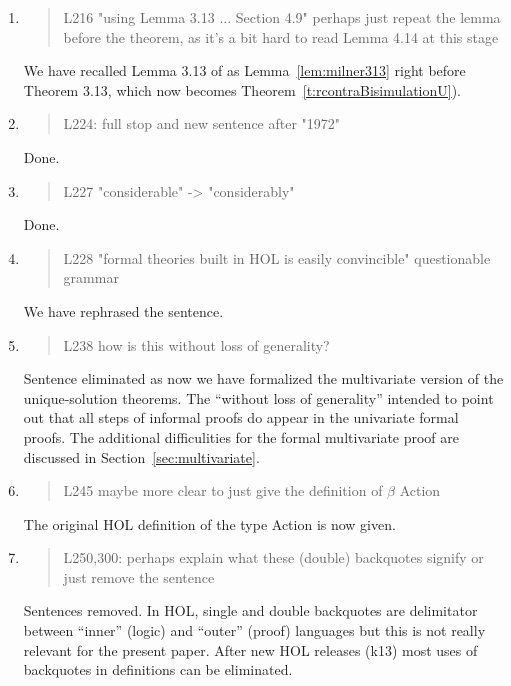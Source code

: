 \begin{enumerate}
\item \begin{quote}
    L216 "using Lemma 3.13 ... Section 4.9" perhaps just repeat the lemma before the theorem, as it's a bit hard to read Lemma 4.14 at this stage 
  \end{quote}

  We have recalled Lemma 3.13 of \cite{Mil89} as
  Lemma~\ref{lem:milner313} right before Theorem 3.13, which now becomes Theorem~\ref{t:rcontraBisimulationU}).

\item \begin{quote}
    L224: full stop and new sentence after "1972"
  \end{quote}
  Done.
  
\item \begin{quote}
    L227 "considerable" -> "considerably"
  \end{quote}
  Done.
  
\item \begin{quote}
    L228 "formal theories built in HOL is easily convincible" questionable grammar
  \end{quote}

We have rephrased the sentence.
\item \begin{quote}
    L238 how is this without loss of generality?
  \end{quote}

  Sentence eliminated as now we have formalized the multivariate
  version of the unique-solution theorems. The ``without loss of
  generality'' intended to point out  that all steps of
  informal proofs do appear in the univariate formal proofs. The
  additional difficulities for the formal multivariate proof are discussed in Section~\ref{sec:multivariate}.
  
\item \begin{quote}
    L245 maybe more clear to just give the definition of $\beta$ Action 
  \end{quote}

  The original HOL definition of the type Action is now given.
  
\item \begin{quote}
    L250,300: perhaps explain what these (double) backquotes signify or just remove the sentence
  \end{quote}
  Sentences removed. In HOL, single and double backquotes are
  delimitator between ``inner'' (logic) and ``outer'' (proof)
  languages but this is not really  relevant for the present paper.
  After new HOL releases (k13) most uses of backquotes in  definitions can be eliminated.
  

\end{enumerate}
